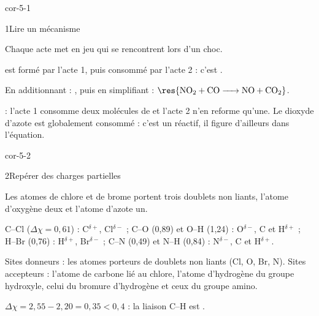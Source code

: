 \corrigesSouples

\begin{blocLivre}{cor-5-1}
\begin{corrige}{1}{Lire un mécanisme}
\begin{questions}
\item Chaque acte met en jeu  qui se rencontrent lors d'un choc.
\item {} est formé par l'acte 1, puis consommé par l'acte 2 : c'est .
\item En additionnant : , puis en simplifiant :
$\res{\ce{NO2 + CO -> NO + CO2}}$.
\item {} : l'acte 1 consomme deux molécules de  et l'acte 2 n'en reforme qu'une. Le dioxyde d'azote
est globalement consommé : c'est un réactif, il figure d'ailleurs dans l'équation.
\end{questions}
\end{corrige}
\end{blocLivre}
\begin{blocLivre}{cor-5-2}
\begin{corrige}{2}{Repérer des charges partielles}
\begin{questions}
\item Les atomes de chlore et de brome portent trois doublets non liants, l'atome d'oxygène deux et l'atome d'azote un.
\item C--Cl ($\Delta\chi=0{,}61$) : C$^{\delta+}$, Cl$^{\delta-}$ ; C--O (0,89) et O--H (1,24) : O$^{\delta-}$, C et H$^{\delta+}$ ;
H--Br (0,76) : H$^{\delta+}$, Br$^{\delta-}$ ; C--N (0,49) et N--H (0,84) : N$^{\delta-}$, C et H$^{\delta+}$.
\item Sites donneurs : les atomes porteurs de doublets non liants (Cl, O, Br, N). Sites accepteurs : l'atome de
carbone lié au chlore, l'atome d'hydrogène du groupe hydroxyle, celui du bromure d'hydrogène et ceux du groupe amino.
\item $\Delta\chi=2{,}55-2{,}20=0{,}35<0{,}4$ : la liaison C--H est .
\end{questions}
\end{corrige}
\end{blocLivre}

